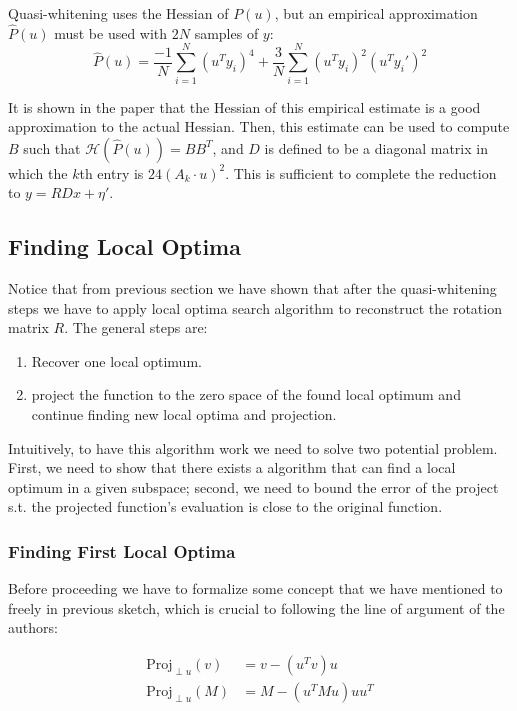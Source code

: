 Quasi-whitening uses the Hessian of $P(u)$, but an empirical approximation $\hat P(u)$ must be used with $2N$ samples of $y$:
$$ \hat P(u) = \frac{-1}{N} \sum_{i=1}^N (u^T y_i)^4 + \frac{3}{N} \sum_{i=1}^N (u^T y_i)^2 (u^T y_i')^2 $$

It is shown in the paper that the Hessian of this empirical estimate
is a good approximation to the actual Hessian. Then, this estimate
can be used to compute $B$ such that $\mathcal{H}(\hat P(u)) = BB^T$,
and $D$ is defined to be a diagonal matrix in which the $k$th entry
is $24 (A_k \cdot u)^2$. This is sufficient to complete the reduction
to $y = RDx + \eta'$.

\subsection{Finding Local Optima}\label{sec:ica-search}

Notice that from previous section we have shown that after the
quasi-whitening steps we have to apply local optima search algorithm
to reconstruct the rotation matrix $R$. The general steps are:

\begin{enumerate}
    \item Recover one local optimum.
    \item project the function to the zero space of the found local optimum and continue finding new local optima and projection.
\end{enumerate}

Intuitively, to have this algorithm work we need to solve two
potential problem. First, we need to show that there exists a
algorithm that can find a local optimum in a given subspace; second,
we need to bound the error of the project s.t. the projected
function's evaluation is close to the original function.

\subsubsection{Finding First Local Optima}
Before proceeding we have to formalize some concept that we have
mentioned to freely in previous sketch, which is crucial to following
the line of argument of the authors:

\begin{definition}
    \begin{align*}
        \text{Proj}_{\perp u}(v) &= v - (u^Tv)u\\
        \text{Proj}_{\perp u}(M) &= M - (u^TMu)uu^T
    \end{align*}
\end{definition}

